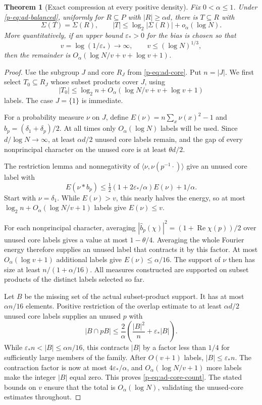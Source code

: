 \documentclass[11pt,a4paper]{article}
\newtheorem{theorem}{Theorem}[section]
\theoremstyle{definition}
\theoremstyle{remark}
\begin{document}
\begin{theorem}[Exact compression at every positive density]\label{p-thm:all-compression}
Fix $0<\alpha\leq1$. Under \eqref{p-eq:ad-balanced}, uniformly for
$R\subseteq P$ with $|R|\geq\alpha d$, there is $T\subseteq R$ with
\[
 \Sigma(T)=\Sigma(R),\qquad
 |T|\leq\log_2|\Sigma(R)|+o_\alpha(\log N).
\]
More quantitatively, if an upper bound $\varepsilon_*>0$ for the bias
is chosen so that
\[
 v=\log(1/\varepsilon_*)\longrightarrow\infty,
 \qquad v\leq(\log N)^{1/3},
\]
then the remainder is
$O_\alpha(\log N/v+v+\log v+1)$.
\end{theorem}
\begin{proof}
Use the subgroup $J$ and core $R_J$ from \eqref{p-eq:ad-core}.
Put $n=|J|$. We first select $T_0\subseteq R_J$ whose subset products
cover $J$, using
\begin{equation}\label{p-eq:ad-core-count}
 |T_0|\leq\log_2n+
 O_\alpha(\log N/v+v+\log v+1)
\end{equation}
labels. The case $J=\{1\}$ is immediate.

For a probability measure $\nu$ on $J$, define
$E(\nu)=n\sum_x\nu(x)^2-1$ and $b_p=(\delta_1+\delta_p)/2$.
At all times only $O_\alpha(\log N)$ labels will be used. Since
$d/\log N\to\infty$, at least $\alpha d/2$ unused core labels remain,
and the gap of every nonprincipal character on the unused core is
at least $\theta d/2$.

The restriction lemma and nonnegativity of
$\langle\nu,\nu(p^{-1}\cdot)\rangle$ give an unused core label with
\[
 E(\nu*b_p)
 \leq\tfrac12(1+2\varepsilon_*/\alpha)E(\nu)+1/\alpha.
\]
Start with $\nu=\delta_1$. While $E(\nu)>v$, this nearly halves the
energy, so at most $\log_2n+O_\alpha(\log N/v+1)$ labels give
$E(\nu)\leq v$.

For each nonprincipal character, averaging
$|\widehat b_p(\chi)|^2=(1+\operatorname{Re}\chi(p))/2$
over unused core labels gives a value at most $1-\theta/4$.
Averaging the whole Fourier energy therefore supplies an unused label
that contracts it by this factor. At most $O_\alpha(\log v+1)$
additional labels give $E(\nu)\leq\alpha/16$.
The support of $\nu$ then has size at least $n/(1+\alpha/16)$.
All measures constructed are supported on subset products of the
distinct labels selected so far.

Let $B$ be the missing set of the actual subset-product support.
It has at most $\alpha n/16$ elements. Positive restriction of the
overlap estimate to at least $\alpha d/2$ unused core labels supplies
an unused $p$ with
\[
 |B\cap pB|
 \leq\frac2\alpha\left(\frac{|B|^2}{n}
                         +\varepsilon_*|B|\right).
\]
While $\varepsilon_*n<|B|\leq\alpha n/16$, this contracts $|B|$
by a factor less than $1/4$ for sufficiently large members of the
family. After $O(v+1)$ labels, $|B|\leq\varepsilon_*n$.
The contraction factor is now at most $4\varepsilon_*/\alpha$, and
$O_\alpha(\log N/v+1)$ more labels make the integer $|B|$ equal zero.
This proves \eqref{p-eq:ad-core-count}. The stated bounds on $v$ ensure
that the total is $O_\alpha(\log N)$, validating the unused-core
estimates throughout.


\end{proof}
\end{document}
